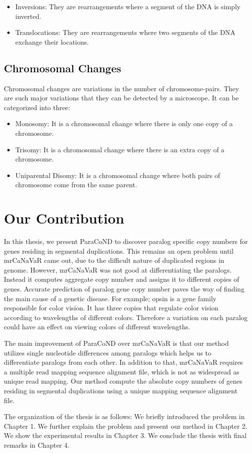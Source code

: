 \begin{itemize}
    \item Inversions: They are rearrangements where a segment of the DNA is simply inverted.
    \item Translocations: They are rearrangements where two segments of the DNA exchange their locations. 
\end{itemize}

\subsection{Chromosomal Changes}
Chromosomal changes are variations in the number of chromosome-pairs. They are such major variations that they can be detected by a microscope. It can be categorized into three:

\begin{itemize}
    \item Monosomy: It is a chromosomal change where there is only one copy of a chromosome.
    \item Trisomy: It is a chromosomal change where there is an extra copy of a chromosome.
    \item Uniparental Disomy: It is a chromosomal change where both pairs of chromosome come from the same parent.
\end{itemize}

\section{Our Contribution}
In this thesis, we present ParaCoND to discover paralog specific copy numbers for genes residing in segmental duplications. This remains an open problem until mrCaNaVaR \cite{alkan2009personalized} came out, due to the difficult nature of duplicated regions in genome. However, mrCaNaVaR was not good at differentiating the paralogs. Instead it computes aggregate copy number and assigns it to different copies of genes. Accurate prediction of paralog gene copy number paves the way of finding the main cause of a genetic disease. For example; opsin is a gene family responsible for color vision. It has three copies that regulate color vision according to wavelengths of different colors. Therefore a variation on each paralog could have an effect on viewing colors of different wavelengths.

The main improvement of ParaCoND over mrCaNaVaR is that our method utilizes single nucleotide differences among paralogs which helps us to differentiate paralogs from each other. In addition to that, mrCaNaVaR requires a multiple read mapping sequence alignment file, which is not as widespread as unique read mapping. Our method compute the absolute copy numbers of genes residing in segmental duplications using a unique mapping sequence alignment file. 

The organization of the thesis is as follows: We briefly introduced the problem in Chapter 1. We further explain the problem and present our method in Chapter 2. We show the experimental results in Chapter 3. We conclude the thesis with final remarks in Chapter 4. 